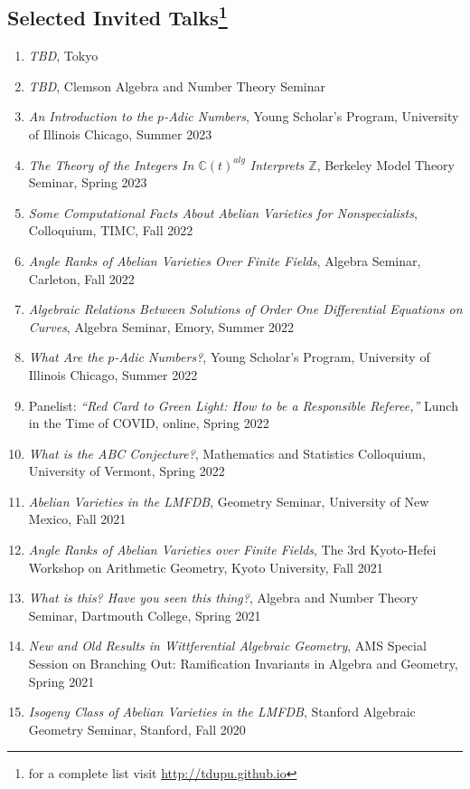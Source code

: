 \documentclass[a4paper,10pt]{article}
\begin{document}
\subsection*{Selected Invited Talks\footnote{ for a complete list visit \url{http://tdupu.github.io} }} 
\begin{enumerate} %
	\item \emph{TBD}, Tokyo
	\item \emph{TBD}, Clemson Algebra and Number Theory Seminar
	\item \emph{An Introduction to the $p$-Adic Numbers}, Young Scholar’s Program, University of Illinois Chicago, Summer 2023
	\item \emph{The Theory of the Integers In $\mathbb{C}(t)^{alg}$ Interprets $\mathbb{Z}$}, Berkeley Model Theory Seminar, Spring 2023
	\item \emph{Some Computational Facts About Abelian Varieties for Nonspecialists}, Colloquium, TIMC, Fall 2022
	\item \emph{Angle Ranks of Abelian Varieties Over Finite Fields}, Algebra Seminar, Carleton, Fall 2022
	\item \emph{Algebraic Relations Between Solutions of Order One Differential Equations on Curves}, Algebra Seminar, Emory, Summer 2022
	\item \emph{What Are the $p$-Adic Numbers?}, Young Scholar’s Program, University of Illinois Chicago, Summer 2022
	\item Panelist: \emph{“Red Card to Green Light: How to be a Responsible Referee,”} Lunch in the Time of COVID, online, Spring 2022
	\item \emph{What is the ABC Conjecture?}, Mathematics and Statistics Colloquium, University of Vermont, Spring 2022
	\item \emph{Abelian Varieties in the LMFDB}, Geometry Seminar, University of New Mexico, Fall 2021
	\item \emph{Angle Ranks of Abelian Varieties over Finite Fields}, The 3rd Kyoto-Hefei Workshop on Arithmetic Geometry, Kyoto University, Fall 2021
	\item \emph{What is this? Have you seen this thing?}, Algebra and Number Theory Seminar, Dartmouth College, Spring 2021
	\item \emph{New and Old Results in Wittferential Algebraic Geometry}, AMS Special Session on Branching Out: Ramification Invariants in Algebra and Geometry, Spring 2021
	\item \emph{Isogeny Class of Abelian Varieties in the LMFDB}, Stanford Algebraic Geometry Seminar, Stanford, Fall 2020

\end{enumerate}
\end{document}
